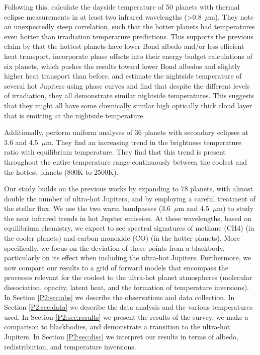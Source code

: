 Following this, \citet{Schwartz2015} calculate the dayside temperature of 50 planets with thermal eclipse measurements in at least two infrared wavelengths (>0.8~$\mu$m). They note an unexpectedly steep correlation, such that the hotter planets had temperatures even hotter than irradiation temperature predictions. This supports the previous claim by \citet{Cowan2011b} that the hottest planets have lower Bond albedo and/or less efficient heat transport.
\citet{Schwartz2017} incorporate phase offsets into their energy budget calculations of six planets, which pushes the results toward lower Bond albedos and slightly higher heat transport than before. \citet{Keating2019} and \citet{Beatty2019} estimate the nightside temperature of several hot Jupiters using \spitzer phase curves and find that despite the different levels of irradiation, they all demonstrate similar nightside temperatures. This suggests that they might all have some chemically similar high optically thick cloud layer that is emitting at the nightside temperature.

Additionally, \citet{Garhart2020} perform  uniform analyses of 36 planets with \spitzerIRAC secondary eclipses at 3.6 and 4.5~$\mu$m. They find an increasing trend in the brightness temperature ratio with equilibrium temperature. They find that this trend is present throughout the entire temperature range continuously between the coolest and the hottest planets (800K to 2500K).

Our study builds on the previous works by expanding to 78 planets, with almost double the number of ultra-hot Jupiters, and by employing a careful treatment of the stellar flux. We use the two warm \spitzerIRAC bandpasses (3.6~$\mu$m and 4.5~$\mu$m) \citep{Fazio2004, Werner2004} to study the near infrared trends in hot Jupiter emission. At these wavelengths, based on equilibrium chemistry, we expect to see spectral signatures of methane (CH4) (in the cooler planets) and carbon monoxide (CO) (in the hotter planets).
More specifically, we focus on the deviation of these points from a blackbody, particularly on its effect when including the ultra-hot Jupiters. Furthermore, we now compare our results to a grid of forward models that encompass the processes relevant for the coolest to the ultra-hot planet atmospheres (molecular dissociation,  opacity, latent heat, and the formation of temperature inversions). In Section \ref{P2:sec:obs} we describe the \spitzerIRAC observations and data collection. In Section \ref{P2:sec:data} we describe the data analysis and the various temperatures used. In Section \ref{P2:sec:results} we present the results of the survey, we make a comparison to blackbodies, and demonstrate a transition to the ultra-hot Jupiters. In Section \ref{P2:sec:disc} we interpret our results in terms of albedo, redistribution, and temperature inversions.

